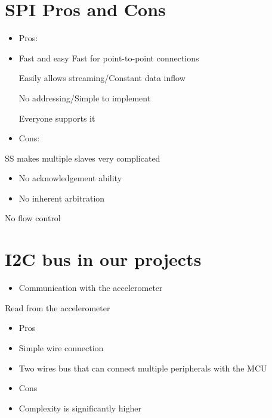 \documentclass[10pt]{article}
\begin{document}
\section{SPI Pros and Cons}
\begin{itemize}
  \item Pros:

  \item Fast and easy
Fast for point-to-point connections

Easily allows streaming/Constant data inflow

No addressing/Simple to implement

Everyone supports it

  \item Cons:

\end{itemize}

SS makes multiple slaves very complicated

\begin{itemize}
  \item No acknowledgement ability

  \item No inherent arbitration

\end{itemize}

No flow control

\section{I2C bus in our projects}
\begin{itemize}
  \item Communication with the accelerometer
\end{itemize}

Read from the accelerometer

\begin{itemize}
  \item Pros

  \item Simple wire connection

  \item Two wires bus that can connect multiple peripherals with the $\mathrm{MCU}$

  \item Cons

  \item Complexity is significantly higher

\end{itemize}
\end{document}
